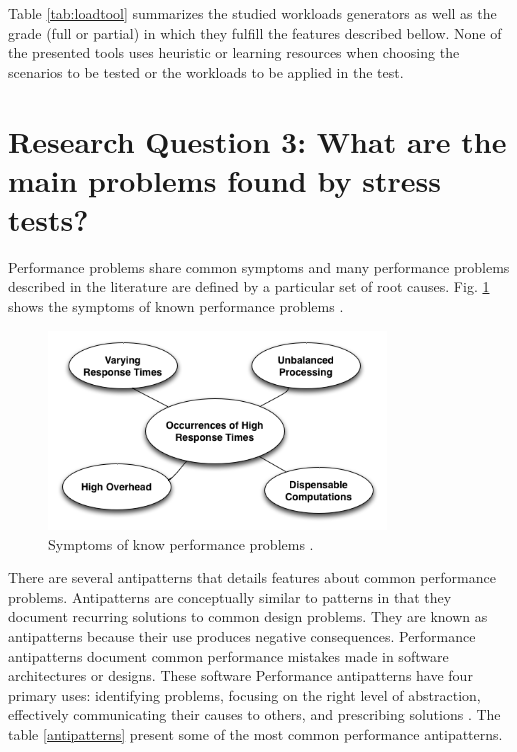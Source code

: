 Table \ref{tab:loadtool} summarizes the studied workloads generators as well as the grade (full or partial) in which they fulfill the features described bellow. None of the presented tools uses heuristic or learning resources when choosing the scenarios to be tested or the workloads to be applied in the test.

\section{Research Question 3: What are the main problems found by stress tests?}

 Performance problems share common symptoms and many performance problems described in the literature are defined by a particular set of root causes. Fig. \ref{fig:symptoms}  shows the symptoms of known performance problems \cite{Wert2013a}. 



\begin{figure}[h]
\centering
\includegraphics[width=0.8\textwidth]{./images/symptoms.png}
\caption{Symptoms of know performance problems \cite{Wert2013a}. }
\label{fig:symptoms}
\end{figure}


There are several antipatterns that details features about  common performance problems. Antipatterns are conceptually similar to patterns in that they document recurring solutions to common design problems. They are known as
antipatterns because their use produces negative consequences.  Performance antipatterns document common performance mistakes made in software architectures or designs. These software Performance antipatterns have four primary uses: identifying problems,
focusing on the
right level of abstraction,
effectively communicating
their causes to others, and prescribing solutions \cite{brown1998antipatterns}. The table \ref{antipatterns} present some of the most common performance antipatterns.


